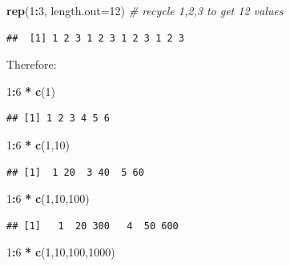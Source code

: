 \documentclass[10pt,b5paper,krantz1]{krantz}
\newenvironment{Shaded}{\begin{snugshade}}{\end{snugshade}}
\newcommand{\CommentTok}[1]{\textcolor[rgb]{0.37,0.37,0.37}{\textit{#1}}}
\newcommand{\DataTypeTok}[1]{\textcolor[rgb]{0.27,0.27,0.27}{#1}}
\newcommand{\DecValTok}[1]{\textcolor[rgb]{0.06,0.06,0.06}{#1}}
\newcommand{\KeywordTok}[1]{\textcolor[rgb]{0.27,0.27,0.27}{\textbf{#1}}}
\newcommand{\NormalTok}[1]{#1}
\newcommand{\OperatorTok}[1]{\textcolor[rgb]{0.43,0.43,0.43}{\textbf{#1}}}
\newcommand{\StringTok}[1]{\textcolor[rgb]{0.5,0.5,0.5}{#1}}
\begin{document}
\begin{Shaded}
\begin{Highlighting}[]
\KeywordTok{rep}\NormalTok{(}\DecValTok{1}\OperatorTok{:}\DecValTok{3}\NormalTok{, }\DataTypeTok{length.out=}\DecValTok{12}\NormalTok{) }\CommentTok{# recycle 1,2,3 to get 12 values}
\end{Highlighting}
\end{Shaded}

\begin{verbatim}
##  [1] 1 2 3 1 2 3 1 2 3 1 2 3
\end{verbatim}

Therefore:

\begin{Shaded}
\begin{Highlighting}[]
\DecValTok{1}\OperatorTok{:}\DecValTok{6} \OperatorTok{*}\StringTok{ }\KeywordTok{c}\NormalTok{(}\DecValTok{1}\NormalTok{)}
\end{Highlighting}
\end{Shaded}

\begin{verbatim}
## [1] 1 2 3 4 5 6
\end{verbatim}

\begin{Shaded}
\begin{Highlighting}[]
\DecValTok{1}\OperatorTok{:}\DecValTok{6} \OperatorTok{*}\StringTok{ }\KeywordTok{c}\NormalTok{(}\DecValTok{1}\NormalTok{,}\DecValTok{10}\NormalTok{)}
\end{Highlighting}
\end{Shaded}

\begin{verbatim}
## [1]  1 20  3 40  5 60
\end{verbatim}

\begin{Shaded}
\begin{Highlighting}[]
\DecValTok{1}\OperatorTok{:}\DecValTok{6} \OperatorTok{*}\StringTok{ }\KeywordTok{c}\NormalTok{(}\DecValTok{1}\NormalTok{,}\DecValTok{10}\NormalTok{,}\DecValTok{100}\NormalTok{)}
\end{Highlighting}
\end{Shaded}

\begin{verbatim}
## [1]   1  20 300   4  50 600
\end{verbatim}

\begin{Shaded}
\begin{Highlighting}[]
\DecValTok{1}\OperatorTok{:}\DecValTok{6} \OperatorTok{*}\StringTok{ }\KeywordTok{c}\NormalTok{(}\DecValTok{1}\NormalTok{,}\DecValTok{10}\NormalTok{,}\DecValTok{100}\NormalTok{,}\DecValTok{1000}\NormalTok{)}
\end{Highlighting}
\end{Shaded}
\end{document}

